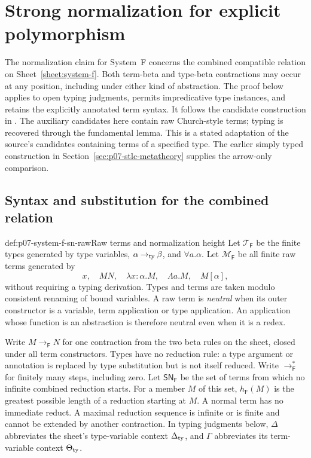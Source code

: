 \section{Strong normalization for explicit polymorphism}
\label{sec:p07-system-f-normalization}

The normalization claim for System~F concerns the combined compatible
relation on Sheet~\ref{sheet:system-f}. Both term-beta and type-beta
contractions may occur at any position, including under either kind of
abstraction. The proof below applies to open typing judgments, permits
impredicative type instances, and retains the explicitly annotated term
syntax. It follows the candidate construction in
\cite[Chapter~14, with Chapters~6 and 11.1--11.2]{GirardLafontTaylor2003Web}.
The auxiliary candidates here contain raw Church-style terms; typing is
recovered through the fundamental lemma. This is a stated adaptation of
the source's candidates containing terms of a specified type.
The earlier simply typed construction in
Section~\ref{sec:p07-stlc-metatheory} supplies the arrow-only comparison.

\subsection{Syntax and substitution for the combined relation}
\label{sec:p07-system-f-sn-syntax}

\begin{hbdefinition}{def:p07-system-f-sn-raw}{Raw terms and normalization height}
Let \(\mathcal T_{\mathsf F}\) be the finite types generated by type
variables, \(\alpha\mathbin{\to_{\rm ty}}\beta\), and
\(\forall a.\alpha\). Let \(\mathcal M_{\mathsf F}\) be all finite
raw terms generated by
\[
 x,\quad MN,\quad\lambda x{:}\alpha.M,\quad
 \Lambda a.M,\quad M[\alpha],
\]
without requiring a typing derivation. Types and terms are taken modulo
consistent renaming of bound variables. A raw term is \emph{neutral} when
its outer constructor is a variable, term application or type application.
An application whose function is an abstraction is therefore neutral even
when it is a redex.

Write \(M\to_{\mathsf F}N\) for one contraction from the two beta rules
on the sheet, closed under all term constructors. Types have no reduction
rule: a type argument or annotation is replaced by type substitution but
is not itself reduced. Write \(\to_{\mathsf F}^*\) for finitely many
steps, including zero. Let \(\mathsf{SN}_{\mathsf F}\) be the set of
terms from which no infinite combined reduction starts. For a member
\(M\) of this set, \(h_{\mathsf F}(M)\) is the greatest possible
length of a reduction starting at \(M\).
A normal term has no immediate reduct. A maximal reduction sequence is
infinite or is finite and cannot be extended by another contraction.
In typing judgments below, \(\Delta\) abbreviates the sheet's
type-variable context \(\Delta_{\rm ty}\), and \(\Gamma\)
abbreviates its term-variable context \(\Theta_{\rm ty}\).
\end{hbdefinition}

